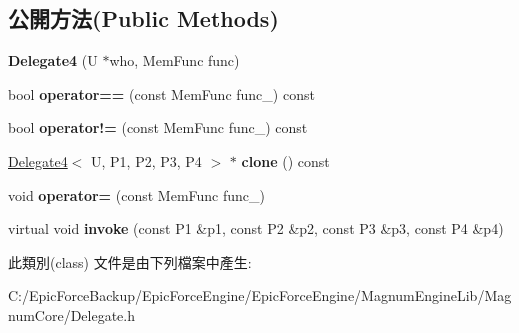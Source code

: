 \subsection*{公開方法(Public Methods)}
\begin{DoxyCompactItemize}
\item 
{\bfseries Delegate4} (U $\ast$who, Mem\+Func func)\hypertarget{class_magnum_1_1_delegate4_af911294f55446b9949b6bb92f7b6e1c5}{}\label{class_magnum_1_1_delegate4_af911294f55446b9949b6bb92f7b6e1c5}

\item 
bool {\bfseries operator==} (const Mem\+Func func\+\_\+) const \hypertarget{class_magnum_1_1_delegate4_a4e6dd37adb4f8eee2f205284c6d6ddbe}{}\label{class_magnum_1_1_delegate4_a4e6dd37adb4f8eee2f205284c6d6ddbe}

\item 
bool {\bfseries operator!=} (const Mem\+Func func\+\_\+) const \hypertarget{class_magnum_1_1_delegate4_a62e349fec301f538f70126fe4660ebc2}{}\label{class_magnum_1_1_delegate4_a62e349fec301f538f70126fe4660ebc2}

\item 
\hyperlink{class_magnum_1_1_delegate4}{Delegate4}$<$ U, P1, P2, P3, P4 $>$ $\ast$ {\bfseries clone} () const \hypertarget{class_magnum_1_1_delegate4_afdc4a2b4b132e1c45a2a1ca297edcfc7}{}\label{class_magnum_1_1_delegate4_afdc4a2b4b132e1c45a2a1ca297edcfc7}

\item 
void {\bfseries operator=} (const Mem\+Func func\+\_\+)\hypertarget{class_magnum_1_1_delegate4_a273fc9a1f3f09719361313a7fbf69b10}{}\label{class_magnum_1_1_delegate4_a273fc9a1f3f09719361313a7fbf69b10}

\item 
virtual void {\bfseries invoke} (const P1 \&p1, const P2 \&p2, const P3 \&p3, const P4 \&p4)\hypertarget{class_magnum_1_1_delegate4_a5f4e4e12dd386f3435eab3ca6740c1c6}{}\label{class_magnum_1_1_delegate4_a5f4e4e12dd386f3435eab3ca6740c1c6}

\end{DoxyCompactItemize}


此類別(class) 文件是由下列檔案中產生\+:\begin{DoxyCompactItemize}
\item 
C\+:/\+Epic\+Force\+Backup/\+Epic\+Force\+Engine/\+Epic\+Force\+Engine/\+Magnum\+Engine\+Lib/\+Magnum\+Core/Delegate.\+h\end{DoxyCompactItemize}
